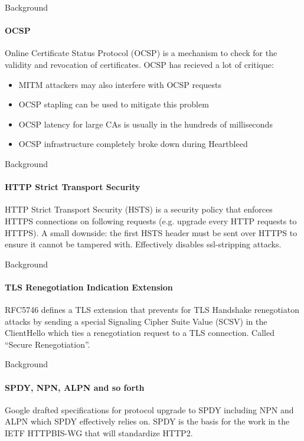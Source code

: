 \documentclass[hyperref={draft}]{beamer}
\begin{document}
\begin{frame}{Background}
  \framesubtitle{OCSP}
  Online Certificate Status Protocol (OCSP) is a mechanism to check for the validity and revocation of certificates.
  \newline
  \newline
  OCSP has recieved a lot of critique:
  \begin{itemize}
    \item MITM attackers may also interfere with OCSP requests
    \item OCSP stapling can be used to mitigate this problem
    \item OCSP latency for large CAs is usually in the hundreds of milliseconds
    \item OCSP infrastructure completely broke down during Heartbleed
  \end{itemize}
\end{frame}

\begin{frame}{Background}
  \framesubtitle{HTTP Strict Transport Security}
  HTTP Strict Transport Security (HSTS) is a security policy that enforces HTTPS connections on following requests (e.g. upgrade every HTTP requests to HTTPS).
  \newline
  \newline
  A small downside: the first HSTS header must be sent over HTTPS to ensure it cannot be tampered with.
  \newline
  \newline
  Effectively disables ssl-stripping attacks.
\end{frame}

\begin{frame}{Background}
  \framesubtitle{TLS Renegotiation Indication Extension}
  RFC5746 defines a TLS extension that prevents for TLS Handshake renegotiaton attacks by sending a special Signaling Cipher Suite Value (SCSV) in the ClientHello which ties a renegotiation request to a TLS connection.
  \newline
  \newline
  Called ``Secure Renegotiation''.
\end{frame}

\begin{frame}{Background}
  \framesubtitle{SPDY, NPN, ALPN and so forth}
  Google drafted specifications for protocol upgrade to SPDY including NPN and ALPN which SPDY effectively relies on. SPDY is the basis for the work in the IETF HTTPBIS-WG that will standardize HTTP2.
\end{frame}
\end{document}
